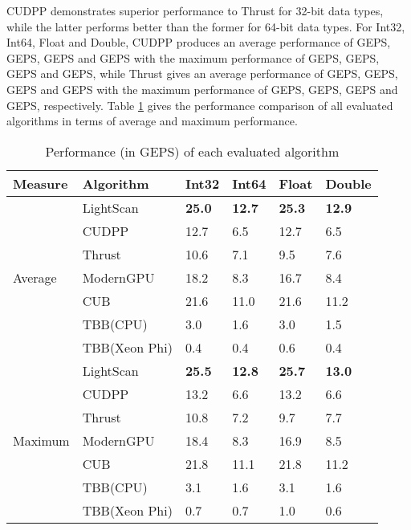 \documentclass[article]{elsarticle}
\begin{document}
{CUDPP demonstrates superior performance to Thrust for 32-bit data types, while the latter performs better than the former for 64-bit data types. For Int32, Int64, Float and Double, CUDPP produces an average performance of  GEPS,  GEPS,  GEPS and  GEPS with the maximum performance of  GEPS,  GEPS,  GEPS and  GEPS, while Thrust gives an average performance of  GEPS,  GEPS,  GEPS and  GEPS with the maximum performance of  GEPS,  GEPS,  GEPS and  GEPS, respectively. Table \ref{tab:gpu_others} gives the performance comparison of all evaluated algorithms in terms of average and maximum performance.
\begin{table}[!h]
\centering
\caption{Performance (in GEPS) of each evaluated algorithm} 
\label{tab:gpu_others}
\begin{tabular}{|l||l||l||l||l||l|}
\hline
\textbf{Measure}&	\textbf{Algorithm}&	\textbf{Int32}&	\textbf{Int64}&	\textbf{Float}&	\textbf{Double}\\
\hline
\multirow{7}{*}{Average}
&	LightScan&	\textbf{25.0}&	\textbf{12.7}&	\textbf{25.3}&	\textbf{12.9}\\
\hhline{~-----}
&	CUDPP&	12.7&	6.5&	12.7&	6.5\\
\hhline{~-----}
&	Thrust&	10.6&	7.1&	9.5&	7.6\\
\hhline{~-----}
&	ModernGPU&	18.2&	8.3&	16.7&	8.4\\
\hhline{~-----}
&	CUB&	21.6&	11.0&	21.6&	11.2\\
\hhline{~-----}
&	TBB(CPU)&	3.0&	1.6&	3.0&	1.5\\
\hhline{~-----}
&	TBB(Xeon Phi)&	0.4&	0.4&	0.6&	0.4\\
\hline
\multirow{7}{*}{Maximum}
&	LightScan&	\textbf{25.5}&	\textbf{12.8}&	\textbf{25.7}&	\textbf{13.0}\\
\hhline{~-----}
&	CUDPP&	13.2&	6.6&	13.2&	6.6\\
\hhline{~-----}
&	Thrust&	10.8&	7.2&	9.7&	7.7\\
\hhline{~-----}
&	ModernGPU&	18.4&	8.3&	16.9&	8.5\\
\hhline{~-----}
&	CUB&	21.8&	11.1&	21.8&	11.2\\
\hhline{~-----}
&	TBB(CPU)&	3.1&	1.6&	3.1&	1.6\\
\hhline{~-----}
&	TBB(Xeon Phi)&	0.7&	0.7&	1.0&	0.6\\
\hline
\end{tabular}
\end{table}

}
\end{document}
